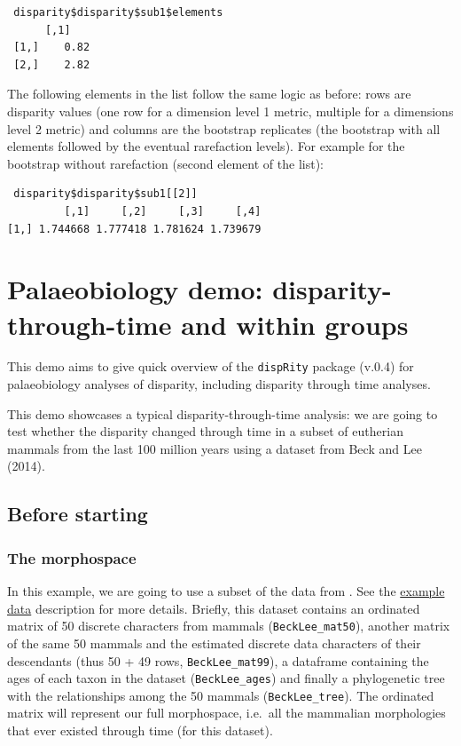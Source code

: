 \documentclass[]{book}
\theoremstyle{definition}
\theoremstyle{definition}
\theoremstyle{remark}
\begin{document}
\begin{verbatim}
 disparity$disparity$sub1$elements
      [,1]
 [1,]    0.82
 [2,]    2.82
\end{verbatim}

The following elements in the list follow the same logic as before: rows
are disparity values (one row for a dimension level 1 metric, multiple
for a dimensions level 2 metric) and columns are the bootstrap
replicates (the bootstrap with all elements followed by the eventual
rarefaction levels). For example for the bootstrap without rarefaction
(second element of the list):

\begin{verbatim}
 disparity$disparity$sub1[[2]]
         [,1]     [,2]     [,3]     [,4]
[1,] 1.744668 1.777418 1.781624 1.739679 
\end{verbatim}

\chapter{Palaeobiology demo: disparity-through-time and within
groups}\label{palaeobiology-demo-disparity-through-time-and-within-groups}

This demo aims to give quick overview of the \texttt{dispRity} package
(v.0.4) for palaeobiology analyses of disparity, including disparity
through time analyses.

This demo showcases a typical disparity-through-time analysis: we are
going to test whether the disparity changed through time in a subset of
eutherian mammals from the last 100 million years using a dataset from
Beck and Lee (2014).

\section{Before starting}\label{before-starting}

\subsection{The morphospace}\label{the-morphospace}

In this example, we are going to use a subset of the data from
\citet{beckancient2014}. See the
\protect\hyperlink{example-data}{example data} description for more
details. Briefly, this dataset contains an ordinated matrix of 50
discrete characters from mammals (\texttt{BeckLee\_mat50}), another
matrix of the same 50 mammals and the estimated discrete data characters
of their descendants (thus 50 + 49 rows, \texttt{BeckLee\_mat99}), a
dataframe containing the ages of each taxon in the dataset
(\texttt{BeckLee\_ages}) and finally a phylogenetic tree with the
relationships among the 50 mammals (\texttt{BeckLee\_tree}). The
ordinated matrix will represent our full morphospace, i.e.~all the
mammalian morphologies that ever existed through time (for this
dataset).
\end{document}
